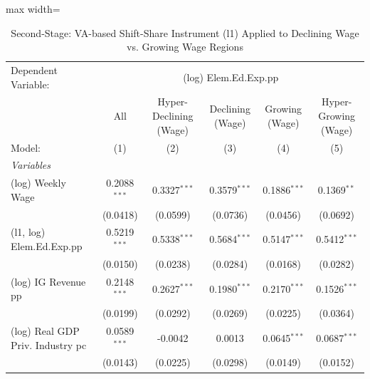 \documentclass[
  10pt,
]{article}
\begin{document}
\begin{table}[htbp]
   \caption{\label{tbl_gdp_ss_wage_subsamples} Second-Stage: VA-based Shift-Share Instrument (l1) Applied to Declining Wage vs. Growing Wage Regions}
   \centering
   \begin{adjustbox}{max width=\textwidth}
      \begin{tabular}{lccccc}
         \tabularnewline \midrule \midrule
         Dependent Variable: & \multicolumn{5}{c}{(log) Elem.Ed.Exp.pp}\\
                                                        & All                    & Hyper-Declining (Wage) & Declining (Wage)      & Growing (Wage)        & Hyper-Growing (Wage) \\   
         Model:                                         & (1)                    & (2)                    & (3)                   & (4)                   & (5)\\  
         \midrule
         \emph{Variables}\\
         (log) Weekly Wage                              & 0.2088$^{***}$         & 0.3327$^{***}$         & 0.3579$^{***}$        & 0.1886$^{***}$        & 0.1369$^{**}$\\   
                                                        & (0.0418)               & (0.0599)               & (0.0736)              & (0.0456)              & (0.0692)\\   
         (l1, log) Elem.Ed.Exp.pp                       & 0.5219$^{***}$         & 0.5338$^{***}$         & 0.5684$^{***}$        & 0.5147$^{***}$        & 0.5412$^{***}$\\   
                                                        & (0.0150)               & (0.0238)               & (0.0284)              & (0.0168)              & (0.0282)\\   
         (log) IG Revenue pp                            & 0.2148$^{***}$         & 0.2627$^{***}$         & 0.1980$^{***}$        & 0.2170$^{***}$        & 0.1526$^{***}$\\   
                                                        & (0.0199)               & (0.0292)               & (0.0269)              & (0.0225)              & (0.0364)\\   
         (log) Real GDP Priv. Industry pc               & 0.0589$^{***}$         & -0.0042                & 0.0013                & 0.0645$^{***}$        & 0.0687$^{***}$\\   
                                                        & (0.0143)               & (0.0225)               & (0.0298)              & (0.0149)              & (0.0152)\\   

\end{tabular}
\end{adjustbox}
\end{table}
\end{document}
